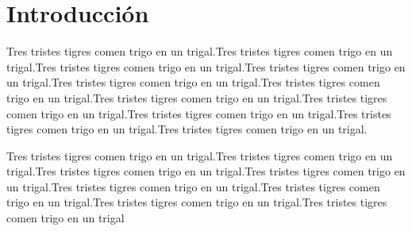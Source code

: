 
\newpage
\section{Introducción}
\label{sec:Introduction}

\justifying \setlength{\parindent}{1.27cm}
\normalsize\mdseries

Tres tristes tigres comen trigo en un trigal.Tres tristes tigres comen trigo en un trigal.Tres tristes tigres comen trigo en un trigal.Tres tristes tigres comen trigo en un trigal.Tres tristes tigres comen trigo en un trigal.Tres tristes tigres comen trigo en un trigal.Tres tristes tigres comen trigo en un trigal.Tres tristes tigres comen trigo en un trigal.Tres tristes tigres comen trigo en un trigal.Tres tristes tigres comen trigo en un trigal.Tres tristes tigres comen trigo en un trigal. \newline

Tres tristes tigres comen trigo en un trigal.Tres tristes tigres comen trigo en un trigal.Tres tristes tigres comen trigo en un trigal.Tres tristes tigres comen trigo en un trigal.Tres tristes tigres comen trigo en un trigal.Tres tristes tigres comen trigo en un trigal.Tres tristes tigres comen trigo en un trigal.Tres tristes tigres comen trigo en un trigal